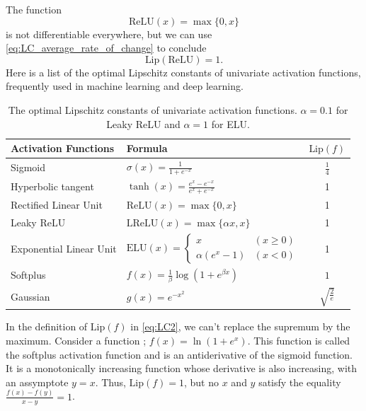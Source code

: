 \documentclass[12pt]{report}
\numberwithin{figure}{chapter}
\theoremstyle{plain}
\theoremstyle{definition}
\theoremstyle{corollary}
\theoremstyle{definition}
\theoremstyle{plain}
\theoremstyle{definition}
\theoremstyle{plain}
\newcommand\lip{\ensuremath{\text{Lip}}}
\begin{document}
The  function
\begin{equation}\label{eq:ReLU}
\text{ReLU}(x)=\max\{0,x\}
\end{equation}
 is not differentiable everywhere, but we can use \eqref{eq:LC_average_rate_of_change} to conclude
\begin{equation}\label{eq:ReLU_LC}
\lip(\text{ReLU})=1.
\end{equation}
Here is a list of the optimal Lipschitz constants of univariate activation functions, frequently used in machine learning and deep learning.
 
\renewcommand\arraystretch{1.5}
\begin{table}[ht]
\centering
\caption{The optimal Lipschitz constants of univariate activation functions.
\(\alpha=0.1\) for Leaky ReLU and \(\alpha=1\) for ELU.}
\begin{tabular}[t]{llc}
\toprule
Activation Functions	&Formula									& $\lip(f)$\\
\midrule
Sigmoid				&$\sigma(x)=\frac1{1+e^{-x}}$				&$\frac14$\\
Hyperbolic tangent	&$\tanh(x)=\frac{e^x-e^{-x}}{e^x+e^{-x}}$	&1\\
Rectified Linear Unit	&$\text{ReLU}(x)=\max\{0,x\}$			&1\\
Leaky ReLU			&$\text{LReLU}(x)=\max\{\alpha x,x\}$	&1\\
Exponential Linear Unit&$\text{ELU}(x)=
\begin{cases}x&(x\ge0)\\\alpha(e^x-1)&(x<0)\end{cases}$	&1\\
Softplus			&$f(x)=\frac1\beta\log(1+e^{\beta x})$	&$1$\\
Gaussian			&$g(x)=e^{-x^2}$								&$\sqrt{\frac2e}$\\
\bottomrule
\end{tabular}
\end{table}

In the definition of \(\lip(f)\) in \eqref{eq:LC2}, we can't replace the supremum by the maximum.
Consider a function ; \(f(x)=\ln(1+e^x)\).
This function is called the softplus activation function and is an antiderivative of the sigmoid function.
It is a monotonically increasing function whose derivative is also increasing, with an assymptote \(y=x\).
Thus, \(\lip(f)=1\), but no \(x\) and \(y\) satisfy the equality \(\frac{f(x)-f(y)}{x-y}=1\).
\end{document}
